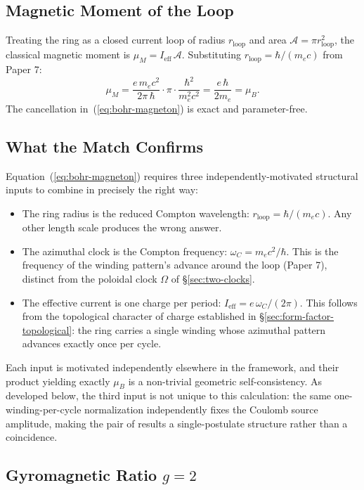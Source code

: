 \subsection{Magnetic Moment of the Loop}

Treating the ring as a closed current loop of radius $r_{\text{loop}}$
and area $\mathcal{A} = \pi r_{\text{loop}}^2$, the classical magnetic
moment is $\mu_M = I_{\text{eff}}\,\mathcal{A}$. Substituting
$r_{\text{loop}} = \hbar/(m_e c)$ from Paper 7:
\begin{equation}
\mu_M = \frac{e\,m_e c^2}{2\pi\,\hbar}\cdot \pi\cdot\frac{\hbar^2}{m_e^2 c^2}
      = \frac{e\,\hbar}{2 m_e}
      = \mu_B.
\label{eq:bohr-magneton}
\end{equation}
The cancellation in~(\ref{eq:bohr-magneton}) is exact and parameter-free.

\subsection{What the Match Confirms}

Equation~(\ref{eq:bohr-magneton}) requires three independently-motivated
structural inputs to combine in precisely the right way:
\begin{itemize}
\item The ring radius is the reduced Compton wavelength:
  $r_{\text{loop}} = \hbar/(m_e c)$. Any other length scale produces the
  wrong answer.
\item The azimuthal clock is the Compton frequency:
  $\omega_C = m_e c^2/\hbar$. This is the frequency of the winding
  pattern's advance around the loop (Paper 7), distinct from the
  poloidal clock $\Omega$ of §\ref{sec:two-clocks}.
\item The effective current is one charge per period:
  $I_{\text{eff}} = e\,\omega_C/(2\pi)$. This follows from the
  topological character of charge established in
  §\ref{sec:form-factor-topological}: the ring carries a single winding
  whose azimuthal pattern advances exactly once per cycle.
\end{itemize}
Each input is motivated independently elsewhere in the framework, and
their product yielding exactly $\mu_B$ is a non-trivial geometric
self-consistency. As developed below, the third input is not unique to
this calculation: the same one-winding-per-cycle normalization
independently fixes the Coulomb source amplitude, making the pair of
results a single-postulate structure rather than a coincidence.

\subsection{Gyromagnetic Ratio $g = 2$}

